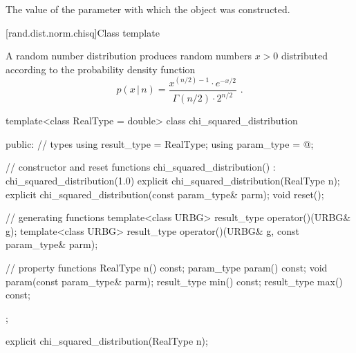 \begin{itemdescr}
\pnum
\returns
The value of the  parameter
 with which the object was constructed.
\end{itemdescr}


[rand.dist.norm.chisq]{Class template }%
%
%

\pnum
A  random number distribution
produces random numbers $x > 0$
distributed according to
the probability density function%
%
%
\[ p(x\,|\,n) = \frac{x^{(n/2)-1} \cdot e^{-x/2}}{\Gamma(n/2) \cdot 2^{n/2}} \text{ .} \]

%
%
\begin{codeblock}
template<class RealType = double>
  class chi_squared_distribution {
  public:
    // types
    using result_type = RealType;
    using param_type  = @\unspec@;

    // constructor and reset functions
    chi_squared_distribution() : chi_squared_distribution(1.0) {}
    explicit chi_squared_distribution(RealType n);
    explicit chi_squared_distribution(const param_type& parm);
    void reset();

    // generating functions
    template<class URBG>
      result_type operator()(URBG& g);
    template<class URBG>
      result_type operator()(URBG& g, const param_type& parm);

    // property functions
    RealType n() const;
    param_type param() const;
    void param(const param_type& parm);
    result_type min() const;
    result_type max() const;
  };
\end{codeblock}

\begin{indexed}{}
\begin{itemdecl}
explicit chi_squared_distribution(RealType n);
\end{itemdecl}
\end{indexed}


